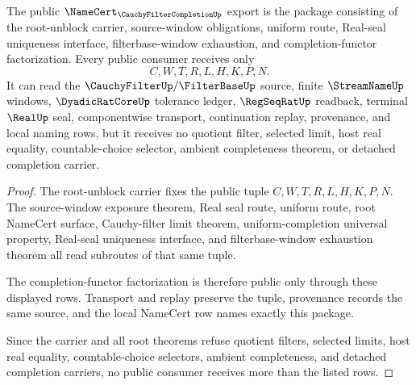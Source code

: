\begin{theorem}
\label{thm:cauchy-filter-completion-public-export-package}
The public $\NameCert_{\CauchyFilterCompletionUp}$ export is the package consisting of the root-unblock carrier, source-window obligations, uniform route, Real-seal uniqueness interface, filterbase-window exhaustion, and completion-functor factorization. Every public consumer receives only
$$
C,W,T,R,L,H,K,P,N .
$$
It can read the $\CauchyFilterUp/\FilterBaseUp$ source, finite $\StreamNameUp$ windows, $\DyadicRatCoreUp$ tolerance ledger, $\RegSeqRatUp$ readback, terminal $\RealUp$ seal, componentwise transport, continuation replay, provenance, and local naming rows, but it receives no quotient filter, selected limit, host real equality, countable-choice selector, ambient completeness theorem, or detached completion carrier.
\end{theorem}
\begin{proof}
The root-unblock carrier fixes the public tuple $C,W,T,R,L,H,K,P,N$. The source-window exposure theorem, Real seal route, uniform route, root NameCert surface, Cauchy-filter limit theorem, uniform-completion universal property, Real-seal uniqueness interface, and filterbase-window exhaustion theorem all read subroutes of that same tuple.

The completion-functor factorization is therefore public only through these displayed rows. Transport and replay preserve the tuple, provenance records the same source, and the local NameCert row names exactly this package.

Since the carrier and all root theorems refuse quotient filters, selected limits, host real equality, countable-choice selectors, ambient completeness, and detached completion carriers, no public consumer receives more than the listed rows.
\end{proof}

